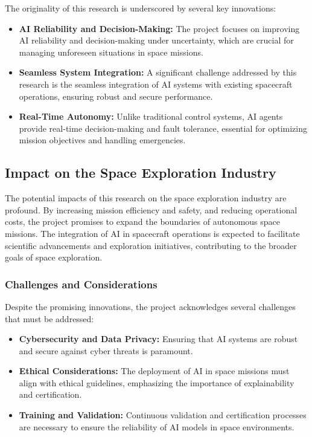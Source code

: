 \documentclass[a4paper, 11pt]{article}
\begin{document}
The originality of this research is underscored by several key innovations:

\begin{itemize}
    \item \textbf{AI Reliability and Decision-Making:} The project focuses on improving AI reliability and decision-making under uncertainty, which are crucial for managing unforeseen situations in space missions.
    \item \textbf{Seamless System Integration:} A significant challenge addressed by this research is the seamless integration of AI systems with existing spacecraft operations, ensuring robust and secure performance.
    \item \textbf{Real-Time Autonomy:} Unlike traditional control systems, AI agents provide real-time decision-making and fault tolerance, essential for optimizing mission objectives and handling emergencies.
\end{itemize}

\subsection{Impact on the Space Exploration Industry}

The potential impacts of this research on the space exploration industry are profound. By increasing mission efficiency and safety, and reducing operational costs, the project promises to expand the boundaries of autonomous space missions. The integration of AI in spacecraft operations is expected to facilitate scientific advancements and exploration initiatives, contributing to the broader goals of space exploration.

\subsubsection{Challenges and Considerations}

Despite the promising innovations, the project acknowledges several challenges that must be addressed:

\begin{itemize}
    \item \textbf{Cybersecurity and Data Privacy:} Ensuring that AI systems are robust and secure against cyber threats is paramount.
    \item \textbf{Ethical Considerations:} The deployment of AI in space missions must align with ethical guidelines, emphasizing the importance of explainability and certification.
    \item \textbf{Training and Validation:} Continuous validation and certification processes are necessary to ensure the reliability of AI models in space environments.
\end{itemize}
\end{document}
